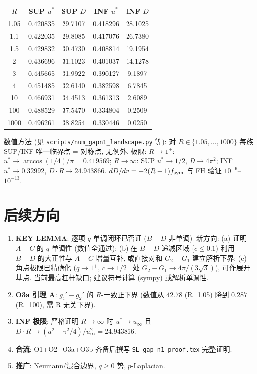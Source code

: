 \documentclass[UTF8]{ctexart}
\begin{document}
\begin{center}
\begin{tabular}{c|cc|cc}
\toprule
$R$ & SUP $u^*$ & SUP $D$ & INF $u^*$ & INF $D$ \\
\midrule
1.05 & 0.420835 & 29.7107 & 0.418296 & 28.1025 \\
1.1  & 0.422035 & 29.8085 & 0.417076 & 26.7380 \\
1.5  & 0.429832 & 30.4730 & 0.408814 & 19.1954 \\
2    & 0.436696 & 31.1023 & 0.401037 & 14.1278 \\
3    & 0.445665 & 31.9922 & 0.390127 & 9.1897 \\
4    & 0.451485 & 32.6140 & 0.382598 & 6.7845 \\
10   & 0.466931 & 34.4513 & 0.361313 & 2.6089 \\
100  & 0.488529 & 37.5470 & 0.334804 & 0.2509 \\
1000 & 0.496261 & 38.8254 & 0.330446 & 0.0250 \\
\bottomrule
\end{tabular}
\end{center}

数值方法 (见 \texttt{scripts/num\_gapn1\_landscape.py} 等): 对
$R\in\{1.05,\dots,1000\}$ 每族 SUP/INF 唯一临界点 = 对称点, 无例外.
极限: $R\to1^+$: $u^*\to\arccos(1/4)/\pi = 0.419569$; $R\to\infty$:
SUP $u^*\to1/2$, $D\to4\pi^2$; INF $u^*\to0.32992$, $D\cdot R\to24.943866$.
$dD/du = -2(R-1)f_{\rm sym}$ 与 FH 验证 $10^{-6}$--$10^{-13}$.

\section{后续方向}

\begin{enumerate}
	\item \textbf{KEY LEMMA}: 逐项 $q$-单调闭环已否证 ($B-D$ 非单调),
		新方向: (a) 证明 $A-C$ 的 $q$-单调性 (数值全通过);
		(b) 在 $B-D$ 递减区域 ($c\le0.1$) 利用 $B-D$ 的大正性与 $A-C$ 增量互补,
		或直接对和 $G_2-G_1$ 建立解析下界; (c) 角点极限已精确化 ($q\to1^+$,
		$c\to1/2^-$ 处 $G_2-G_1\to4\pi/(3\sqrt3)$), 可作展开基点.
		当前最高杠杆缺口; 建议符号计算 (sympy) 或解析单调性.
	\item \textbf{O3a 引理 A}: $g_1'-g_2'$ 的 $R$-一致正下界
		(数值从 $42.78$ (R=1.05) 降到 $0.287$ (R=100), 需 R 无关下界).
	\item \textbf{INF 极限}: 严格证明 $R\to\infty$ 时 $u^*\to u_\infty$
		且 $D\cdot R\to (a^2-\pi^2/4)/u_\infty^2 = 24.943866$.
	\item \textbf{合流}: O1+O2+O3a+O3b 齐备后撰写
		\texttt{SL\_gap\_n1\_proof.tex} 完整证明.
	\item \textbf{推广}: Neumann/混合边界, $q\ge0$ 势, $p$-Laplacian.
\end{enumerate}
\end{document}

